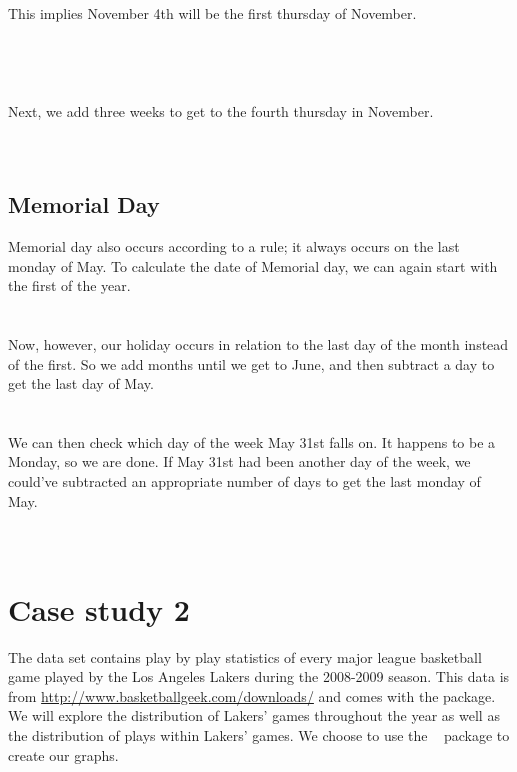 \documentclass[article]{jss}
\begin{document}
This implies November 4th will be the first thursday of November.\\

\\
\\
\\
\\

Next, we add three weeks to get to the fourth thursday in November.\\

\\
\\

\subsection{Memorial Day}
Memorial day also occurs according to a rule; it always occurs on the last monday of May. To calculate the date of Memorial day, we can again start with the first of the year.\\

\\
\\

Now, however, our holiday occurs in relation to the last day of the month instead of the first. So we add months until we get to June, and then subtract a day to get the last day of May.\\

\\
\\

We can then check which day of the week May 31st falls on. It happens to be a Monday, so we are done. If May 31st had been another day of the week, we could've subtracted an appropriate number of days to get the last monday of May.\\

\\
\\


\section{Case study 2}
The  data set contains play by play statistics of every major league basketball game played by the Los Angeles Lakers during the 2008-2009 season. This data is from \url{http://www.basketballgeek.com/downloads/} \citep{bball} and comes with the  package. We will explore the distribution of Lakers' games throughout the year as well as the distribution of plays within Lakers' games. We choose to use the  ~\citep{ggplot2} package to create our graphs.\\
\end{document}
